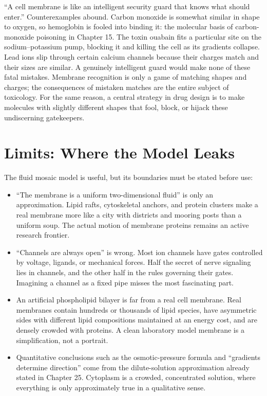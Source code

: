\begin{wuqu}
``A cell membrane is like an intelligent security guard that knows what should enter.'' Counterexamples abound. Carbon monoxide is somewhat similar in shape to oxygen, so hemoglobin is fooled into binding it: the molecular basis of carbon-monoxide poisoning in Chapter 15. The toxin ouabain fits a particular site on the sodium--potassium pump, blocking it and killing the cell as its gradients collapse. Lead ions slip through certain calcium channels because their charges match and their sizes are similar. A genuinely intelligent guard would make none of these fatal mistakes. Membrane recognition is only a game of matching shapes and charges; the consequences of mistaken matches are the entire subject of toxicology. For the same reason, a central strategy in drug design is to make molecules with slightly different shapes that fool, block, or hijack these undiscerning gatekeepers.
\end{wuqu}

\section{Limits: Where the Model Leaks}

The fluid mosaic model is useful, but its boundaries must be stated before use:

\begin{itemize}[itemsep=2pt]
\item ``The membrane is a uniform two-dimensional fluid'' is only an approximation. Lipid rafts, cytoskeletal anchors, and protein clusters make a real membrane more like a city with districts and mooring posts than a uniform soup. The actual motion of membrane proteins remains an active research frontier.
\item ``Channels are always open'' is wrong. Most ion channels have gates controlled by voltage, ligands, or mechanical forces. Half the secret of nerve signaling lies in channels, and the other half in the rules governing their gates. Imagining a channel as a fixed pipe misses the most fascinating part.
\item An artificial phospholipid bilayer is far from a real cell membrane. Real membranes contain hundreds or thousands of lipid species, have asymmetric sides with different lipid compositions maintained at an energy cost, and are densely crowded with proteins. A clean laboratory model membrane is a simplification, not a portrait.
\item Quantitative conclusions such as the osmotic-pressure formula and ``gradients determine direction'' come from the dilute-solution approximation already stated in Chapter 25. Cytoplasm is a crowded, concentrated solution, where everything is only approximately true in a qualitative sense.
\end{itemize}

